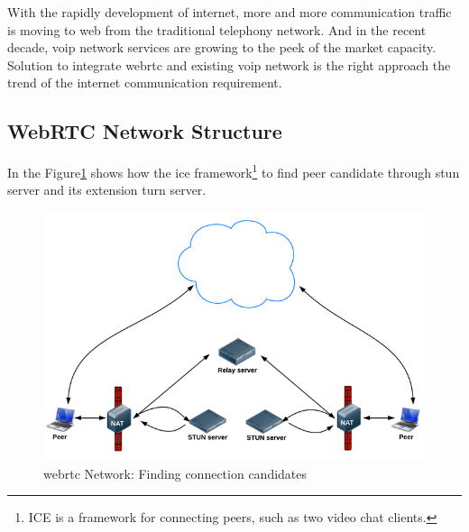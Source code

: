 \par With the rapidly development of internet, more and more communication traffic is moving to web from the traditional telephony network. And in the recent decade, \gls{voip} network services are growing to the peek of the market capacity. Solution to integrate \gls{webrtc} and existing \gls{voip} network is the right approach the trend of the internet communication requirement.

\subsection{WebRTC Network Structure}

\noindent In the Figure\ref{fig:webrtc_network_finCandidate}\cite{html5rock:webrtc} shows how the \gls{ice} framework\footnote{ICE is a framework for connecting peers, such as two video chat clients.\cite{wiki:ice}} to find peer candidate through \gls{stun} server and its extension \gls{turn} server.

\begin{figure}
	\centering
    	\includegraphics[height=0.30\textheight,natwidth=610,natheight=642]{figs/webrtc_network_finCandidate.png}
  	\caption{\gls{webrtc} Network: Finding connection candidates\cite{html5rock:webrtc}}
  	\label{fig:webrtc_network_finCandidate}
\end{figure} 

